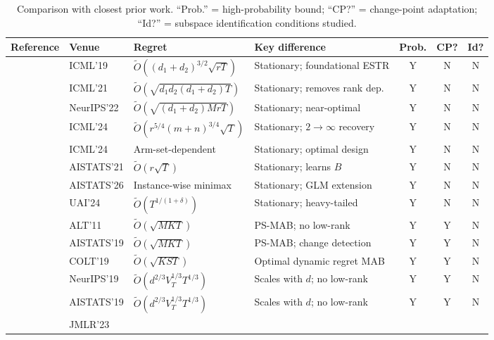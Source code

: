 \documentclass[11pt]{article}
\begin{document}
\begin{table}[t]
\centering
\caption{Comparison with closest prior work.
``Prob.'' = high-probability bound; ``CP?'' = change-point adaptation;
``Id?'' = subspace identification conditions studied.}
\label{tab:comparison}
\small
\setlength{\tabcolsep}{3pt}
\begin{tabular}{llllccc}
\toprule
\textbf{Reference} & \textbf{Venue} & \textbf{Regret} & \textbf{Key difference} & \textbf{Prob.} & \textbf{CP?} & \textbf{Id?} \\
\midrule
\citet{jun2019bilinear} & ICML'19 &
$\widetilde{O}((d_1{+}d_2)^{3/2}\sqrt{rT})$ &
Stationary; foundational ESTR & Y & N & N \\
\citet{jang2021improved} & ICML'21 &
$\widetilde{O}(\sqrt{d_1d_2(d_1{+}d_2)T})$ &
Stationary; removes rank dep. & Y & N & N \\
\citet{kang2022gestt} & NeurIPS'22 &
$\widetilde{O}(\sqrt{(d_1{+}d_2)MrT})$ &
Stationary; near-optimal & Y & N & N \\
\citet{pmlr-v235-jedra24a} & ICML'24 &
$\widetilde{O}(r^{5/4}(m{+}n)^{3/4}\sqrt{T})$ &
Stationary; $2\to\infty$ recovery & Y & N & N \\
\citet{pmlr-v235-jang24e} & ICML'24 &
Arm-set-dependent &
Stationary; optimal design & Y & N & N \\
\citet{lu2021lowrank} & AISTATS'21 &
$\widetilde{O}(r\sqrt{T})$ &
Stationary; learns $B$ & Y & N & N \\
\citet{lee2026gllowpopart} & AISTATS'26 &
Instance-wise minimax &
Stationary; GLM extension & Y & N & N \\
\citet{kang2024heavy} & UAI'24 &
$\widetilde{O}(T^{1/(1+\delta)})$ &
Stationary; heavy-tailed & Y & N & N \\
\midrule
\citet{garivier2011upper} & ALT'11 &
$\widetilde{O}(\sqrt{MKT})$ &
PS-MAB; no low-rank & Y & Y & N \\
\citet{cao2019nearly} & AISTATS'19 &
$\widetilde{O}(\sqrt{MKT})$ &
PS-MAB; change detection & Y & Y & N \\
\citet{auer2019achieving} & COLT'19 &
$\widetilde{O}(\sqrt{KST})$ &
Optimal dynamic regret MAB & Y & Y & N \\
\citet{russac2019weighted} & NeurIPS'19 &
$\widetilde{O}(d^{2/3}V_T^{1/3}T^{1/3})$ &
Scales with $d$; no low-rank & Y & Y & N \\
\citet{cheung2019learning} & AISTATS'19 &
$\widetilde{O}(d^{2/3}V_T^{1/3}T^{1/3})$ &
Scales with $d$; no low-rank & Y & Y & N \\
\citet{abbasi2023dynamic} & JMLR'23 &

\end{tabular}
\end{table}
\end{document}
